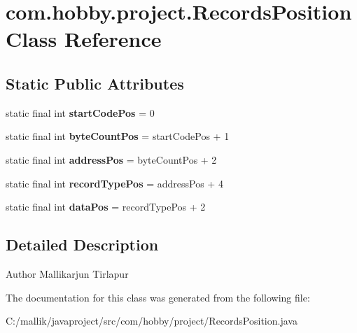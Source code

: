 \hypertarget{classcom_1_1hobby_1_1project_1_1_records_position}{}\section{com.\+hobby.\+project.\+Records\+Position Class Reference}
\label{classcom_1_1hobby_1_1project_1_1_records_position}
\subsection*{Static Public Attributes}
\begin{DoxyCompactItemize}
\item 
\mbox{\label{classcom_1_1hobby_1_1project_1_1_records_position_ad3638141f29de29d0f8e5268c856716d}} 
static final int {\bfseries start\+Code\+Pos} = 0
\item 
\mbox{\label{classcom_1_1hobby_1_1project_1_1_records_position_a8f3c6a7dafaf8f6ff50bc2940dccb21b}} 
static final int {\bfseries byte\+Count\+Pos} = start\+Code\+Pos + 1
\item 
\mbox{\label{classcom_1_1hobby_1_1project_1_1_records_position_a1a31c1acf28c346fda16420019e03a72}} 
static final int {\bfseries address\+Pos} = byte\+Count\+Pos + 2
\item 
\mbox{\label{classcom_1_1hobby_1_1project_1_1_records_position_a0227745e40b81f63e27e8b6d049855ab}} 
static final int {\bfseries record\+Type\+Pos} = address\+Pos + 4
\item 
\mbox{\label{classcom_1_1hobby_1_1project_1_1_records_position_a2957d25cdfa4aeaf5430d30a3c69276d}} 
static final int {\bfseries data\+Pos} = record\+Type\+Pos + 2
\end{DoxyCompactItemize}


\subsection{Detailed Description}
\begin{DoxyAuthor}{Author}
Mallikarjun Tirlapur 
\end{DoxyAuthor}


The documentation for this class was generated from the following file\+:\begin{DoxyCompactItemize}
\item 
C\+:/mallik/javaproject/src/com/hobby/project/Records\+Position.\+java\end{DoxyCompactItemize}
